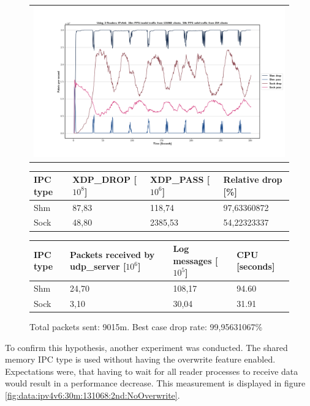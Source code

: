\begin{figure}[!h]
	\centering
	\scriptsize
	\begin{tabular}{c}
    	\centerline{\includegraphics[width=1.2\textwidth]{images/IPv4v6_30m_2ndReader_1.png}}
	\end{tabular}
	\begin{tabular}{llll}
		\toprule
		\textbf{IPC type} & \textbf{XDP\_DROP [$10^8$]} & \textbf{XDP\_PASS [$10^6$]} & \textbf{Relative drop [\%]} \\ \midrule 
		Shm & 87,83 & 118,74 & 97,63360872 \\
        Sock & 48,80 & 2385,53 & 54,22323337 \\
	\bottomrule
	\end{tabular}
    \begin{tabular}{llll}
		\toprule
		\textbf{IPC type} & \textbf{Packets received by udp\_server [$10^6$]} & \textbf{Log messages [$10^5$]} & \textbf{CPU [seconds]} \\ \midrule 
		Shm & 24,70 & 108,17 & 94.60 \\
        Sock & 3,10 & 30,04 & 31.91 \\
	\bottomrule
	\end{tabular}
	\caption[Simplefail2ban with 2nd Reader, IPv4v6, 30m \ac{PPS}, 131068 malicious clients]{Total packets sent: 9015m. Best case drop rate: 99,95631067\%}
	\label{fig:data:ipv4v6:30m:131068:2nd}
\end{figure}

To confirm this hypothesis, another experiment was conducted.
The shared memory IPC type is used without having the overwrite feature enabled.
Expectations were, that having to wait for all reader processes to receive data would result in a performance decrease.
This measurement is displayed in figure \ref{fig:data:ipv4v6:30m:131068:2nd:NoOverwrite}.

